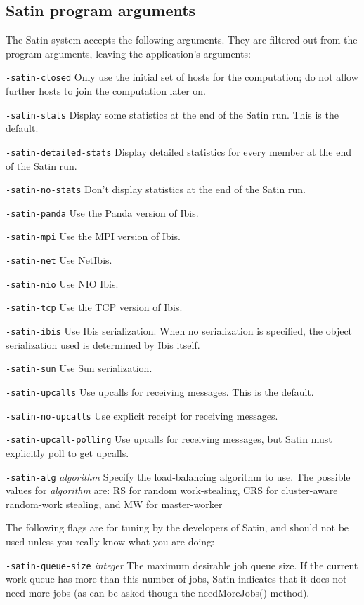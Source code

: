 \documentclass[10pt]{article}
\newcommand{\mysubsection}[1]{\subsection{#1}\label{#1}}
\begin{document}
\mysubsection{Satin program arguments}

The Satin system accepts the following arguments. They are
filtered out from the program arguments, leaving the application's
arguments:
\begin{description}
\item{\texttt{-satin-closed}}
Only use the initial set of hosts for the computation; do not allow
further hosts to join the computation later on.
\item{\texttt{-satin-stats}}
Display some statistics at the end of the Satin run. This is the default.
\item{\texttt{-satin-detailed-stats}}
Display detailed statistics for every member at the end of the Satin run.
\item{\texttt{-satin-no-stats}}
Don't display statistics at the end of the Satin run.
\item{\texttt{-satin-panda}}
Use the Panda version of Ibis.
\item{\texttt{-satin-mpi}}
Use the MPI version of Ibis.
\item{\texttt{-satin-net}}
Use NetIbis.
\item{\texttt{-satin-nio}}
Use NIO Ibis.
\item{\texttt{-satin-tcp}}
Use the TCP version of Ibis.
\item{\texttt{-satin-ibis}}
Use Ibis serialization. When no serialization is specified,
the object serialization used is determined by Ibis itself.
\item{\texttt{-satin-sun}}
Use Sun serialization.
\item{\texttt{-satin-upcalls}}
Use upcalls for receiving messages. This is the default.
\item{\texttt{-satin-no-upcalls}}
Use explicit receipt for receiving messages.
\item{\texttt{-satin-upcall-polling}}
Use upcalls for receiving messages, but Satin must explicitly poll to get
upcalls.
\item{\texttt{-satin-alg} \emph{algorithm}}
Specify the load-balancing algorithm to use. The possible values for
\emph{algorithm} are: RS for random work-stealing, CRS for cluster-aware
random-work stealing, and MW for master-worker
\end{description}

The following flags are for tuning by the developers of Satin,
and should not be used unless you really know what you are doing:
\begin{description}
\item{\texttt{-satin-queue-size} \emph{integer}}
The maximum desirable job queue size. If the current work queue 
has more than this number of jobs, Satin indicates that 
it does not need more jobs (as can be asked though the
needMoreJobs() method).
\end{description}
\end{document}
